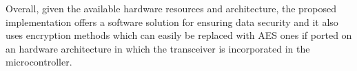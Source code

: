 Overall, given the available hardware resources and architecture, the proposed implementation offers 
a software solution for ensuring data security and it also uses encryption methods which can easily 
be replaced with AES ones if ported on an hardware architecture in which the transceiver is 
incorporated in the microcontroller.
